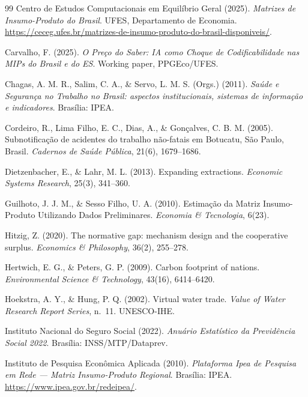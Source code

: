 \documentclass[12pt, a4paper]{article}
\begin{document}
\begin{thebibliography}{99}
Centro de Estudos Computacionais em Equilíbrio Geral (2025).
\textit{Matrizes de Insumo-Produto do Brasil}.
UFES, Departamento de Economia.
\url{https://ceceg.ufes.br/matrizes-de-insumo-produto-do-brasil-disponiveis/}.

Carvalho, F. (2025).
\textit{O Preço do Saber: IA como Choque de Codificabilidade nas MIPs do Brasil e do ES}.
Working paper, PPGEco/UFES.

Chagas, A. M. R., Salim, C. A., \& Servo, L. M. S. (Orgs.) (2011).
\textit{Saúde e Segurança no Trabalho no Brasil: aspectos institucionais,
sistemas de informação e indicadores}.
Brasília: IPEA.

Cordeiro, R., Lima Filho, E. C., Dias, A., \& Gonçalves, C. B. M. (2005).
Subnotificação de acidentes do trabalho não-fatais em Botucatu, São Paulo, Brasil.
\textit{Cadernos de Saúde Pública}, 21(6), 1679--1686.

Dietzenbacher, E., \& Lahr, M. L. (2013).
Expanding extractions.
\textit{Economic Systems Research}, 25(3), 341--360.

Guilhoto, J. J. M., \& Sesso Filho, U. A. (2010).
Estimação da Matriz Insumo-Produto Utilizando Dados Preliminares.
\textit{Economia \& Tecnologia}, 6(23).

Hitzig, Z. (2020).
The normative gap: mechanism design and the cooperative surplus.
\textit{Economics \& Philosophy}, 36(2), 255--278.

Hertwich, E. G., \& Peters, G. P. (2009).
Carbon footprint of nations.
\textit{Environmental Science \& Technology}, 43(16), 6414--6420.

Hoekstra, A. Y., \& Hung, P. Q. (2002).
Virtual water trade.
\textit{Value of Water Research Report Series}, n.~11. UNESCO-IHE.

Instituto Nacional do Seguro Social (2022).
\textit{Anuário Estatístico da Previdência Social 2022}.
Brasília: INSS/MTP/Dataprev.

Instituto de Pesquisa Econômica Aplicada (2010).
\textit{Plataforma Ipea de Pesquisa em Rede --- Matriz Insumo-Produto Regional}.
Brasília: IPEA. \url{https://www.ipea.gov.br/redeipea/}.


\end{thebibliography}
\end{document}
